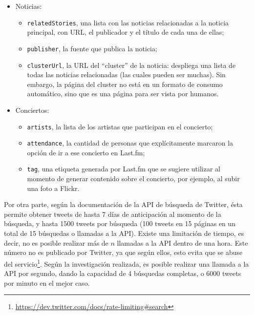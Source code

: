 \documentclass[11pt,letterpaper]{article}
\begin{document}
\begin{itemize}
\item Noticias:

\begin{itemize}
\item \texttt{relatedStories}, una lista con las noticias relacionadas a la
        noticia principal, con URL, el publicador y el título de cada
        una de ellas;
\item \texttt{publisher}, la fuente que publica la noticia;
\item \texttt{clusterUrl}, la URL del ``cluster'' de la noticia: despliega
        una lista de todas las noticias relacionadas (las cuales
        pueden ser muchas). Sin embargo, la página del cluster no está
        en un formato de consumo automático, sino que es una página
        para ser vista por humanos.
\end{itemize}

\item Conciertos:

\begin{itemize}
\item \texttt{artists}, la lista de los artistas que participan en el
        concierto;
\item \texttt{attendance}, la cantidad de personas que explícitamente
        marcaron la opción de ir a ese concierto en Last.fm;
\item \texttt{tag}, una etiqueta generada por Last.fm que se sugiere
        utilizar al momento de generar contenido sobre el concierto,
        por ejemplo, al subir una foto a Flickr.
\end{itemize}

\end{itemize}
    Por otra parte, según la documentación de la API de búsqueda de
    Twitter, ésta permite obtener tweets de hasta 7 días de anticipación al
    momento de la búsqueda, y hasta 1500 tweets por búsqueda (100
    tweets en 15 páginas en un total de 15 búsquedas o llamadas a la
    API). Existe una limitación de tiempo, es decir, no es posible
    realizar más de $n$ llamadas a la API dentro de una hora. Este
    número no es publicado por Twitter, ya que según ellos, esto evita
    que se abuse del
    servicio\footnote{\href{https://dev.twitter.com/docs/rate-limiting#search}{https://dev.twitter.com/docs/rate-limiting\#search} }. Según
    la investigación realizada, es posible realizar una llamada a la
    API por segundo, dando la capacidad de 4 búsquedas completas, o
    6000 tweets por minuto en el mejor caso. 
\end{document}
